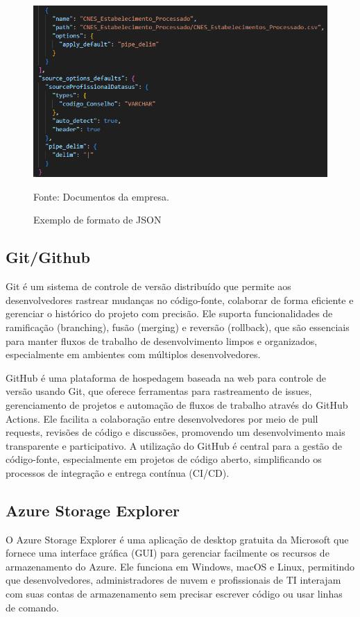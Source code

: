 \begin{figure}[H]
  \centering
  \caption{Exemplo de formato de JSON}\label{fig:jsonformat}
  \includegraphics[width=.6\linewidth]{imagens/json.png}
  \par
  \footnotesize{Fonte: Documentos da empresa.}
\end{figure}

\subsection{Git/Github}

Git é um sistema de controle de versão distribuído que permite aos desenvolvedores rastrear mudanças no código-fonte, colaborar de forma eficiente e gerenciar o histórico do projeto com precisão. Ele suporta funcionalidades de ramificação (branching), fusão (merging) e reversão (rollback), que são essenciais para manter fluxos de trabalho de desenvolvimento limpos e organizados, especialmente em ambientes com múltiplos desenvolvedores.\cite{git_docs}

GitHub é uma plataforma de hospedagem baseada na web para controle de versão usando Git, que oferece ferramentas para rastreamento de issues, gerenciamento de projetos e automação de fluxos de trabalho através do GitHub Actions. Ele facilita a colaboração entre desenvolvedores por meio de pull requests, revisões de código e discussões, promovendo um desenvolvimento mais transparente e participativo. A utilização do GitHub é central para a gestão de código-fonte, especialmente em projetos de código aberto, simplificando os processos de integração e entrega contínua (CI/CD).\cite{github_home}

\subsection{Azure Storage Explorer}

  O Azure Storage Explorer é uma aplicação de desktop gratuita da Microsoft que fornece uma interface gráfica (GUI) para gerenciar facilmente os recursos de armazenamento do Azure. Ele funciona em Windows, macOS e Linux, permitindo que desenvolvedores, administradores de nuvem e profissionais de TI interajam com suas contas de armazenamento sem precisar escrever código ou usar linhas de comando.\cite{microsoft_azure_storage}

